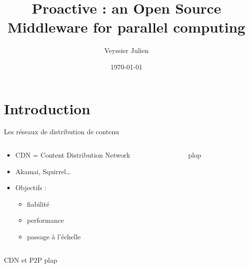 \documentclass{beamer}
\title{Proactive : an Open Source Middleware for parallel computing}
\author{Veyssier Julien}
\institute{CBGP- INRA}
\date\today
\begin{document}
\begin{frame}
\titlepage
\end{frame}

\begin{frame}
\tableofcontents
\end{frame}

\section[Introduction]{Introduction}
\begin{frame}
	\tableofcontents[currentsection]
\end{frame}

\begin{frame}{Les réseaux de distribution de contenu}
	\begin{columns}
	\begin{column}[l]{0.5\linewidth}
	\begin{block}{}
			\begin{itemize}
				\item CDN = Content Distribution Network
				\item Akamai, Squirrel\ldots %
				\item Objectifs :
					\begin{itemize}
						\item fiabilité
						\item performance
						\item passage à l'échelle
					\end{itemize}
			\end{itemize}
					
		\end{block}
	\end{column}
	\begin{column}[r]{0.5\linewidth}
        plop
	\end{column}
	\end{columns}
\end{frame}

\begin{frame}{CDN et P2P}
    plap
\end{frame}
\end{document}
